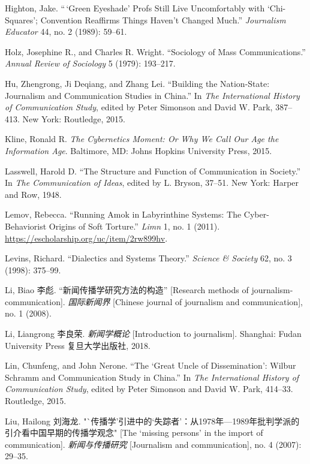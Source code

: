 \documentclass{tufte-handout}
\begin{document}
\begin{CJK*}{UTF8}{gbsn}
\begin{hangparas}{.25in}{1}
\begin{CJK*}{UTF8}{gbsn}
Highton, Jake. ``\,`Green Eyeshade' Profs Still Live Uncomfortably with
`Chi-Squares'; Convention Reaffirms Things Haven't Changed Much.''\emph{
Journalism Educator} 44, no. 2 (1989): 59--61.

Holz, Josephine R., and Charles R. Wright. ``Sociology of Mass
Communications.'' \emph{Annual Review of Sociology} 5 (1979): 193--217.

Hu, Zhengrong, Ji Deqiang, and Zhang Lei. ``Building the Nation-State:
Journalism and Communication Studies in China.'' In \emph{The
International History of Communication Study}, edited by Peter Simonson
and David W. Park, 387--413. New York: Routledge, 2015.

Kline, Ronald R. \emph{The Cybernetics Moment: Or Why We Call Our Age
the Information Age}. Baltimore, MD: Johns Hopkins University Press,
2015.

Lasswell, Harold D. ``The Structure and Function of Communication in
Society.'' In \emph{The Communication of Ideas}, edited by L. Bryson,
37--51. New York: Harper and Row, 1948.

Lemov, Rebecca. ``Running Amok in Labyrinthine Systems: The
Cyber-Behaviorist Origins of Soft Torture.'' \emph{Limn} 1, no. 1
(2011). \url{https://escholarship.org/uc/item/2rw899hv}.

Levins, Richard. ``Dialectics and Systems Theory.'' \emph{Science \&
Society} 62, no. 3 (1998): 375--99.

Li, Biao 李彪. ``新闻传播学研究方法的构造'' {[}Research methods of
journalism-communication{]}. \emph{国际新闻界} {[}Chinese journal of
journalism and communication{]}, no. 1 (2008).

Li, Liangrong 李良荣. \emph{新闻学概论} {[}Introduction to
journalism{]}. Shanghai: Fudan University Press 复旦大学出版社, 2018.

Lin, Chunfeng, and John Nerone. ``The `Great Uncle of Dissemination':
Wilbur Schramm and Communication Study in China.'' In \emph{The
International History of Communication Study}, edited by Peter Simonson
and David W. Park, 414--33. Routledge, 2015.


Liu, Hailong 刘海龙.
"`传播学'引进中的`失踪者'：从1978年---1989年批判学派的引介看中国早期的传播学观念"
{[}The `missing persons' in the import of communication{]}.
\emph{新闻与传播研究} {[}Journalism and communication{]}, no. 4 (2007):
29--35.

\end{CJK*}
\begin{CJK*}{UTF8}{bsmi}


\end{CJK*}
\end{hangparas}
\end{CJK*}
\end{document}
